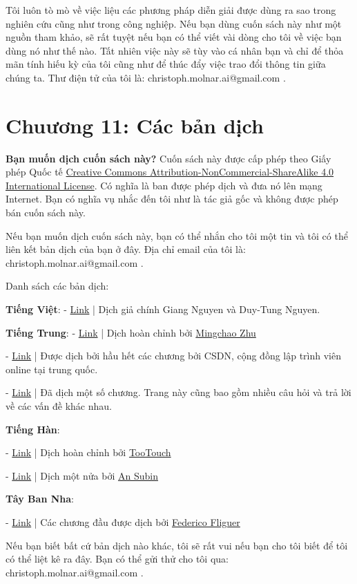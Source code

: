     
Tôi luôn tò mò về việc liệu các phương pháp diễn giải được dùng ra sao trong nghiên cứu cũng như trong công nghiệp. Nếu bạn dùng  cuốn sách này như một nguồn tham khảo, sẽ rất tuyệt nếu bạn có thể viết vài dòng cho tôi về việc bạn dùng nó như thế nào. Tất nhiên việc này sẽ tùy vào cá nhân bạn và chỉ để thỏa mãn tính hiếu kỳ của tôi cũng như để thúc đẩy việc trao đổi thông tin giữa chúng ta. Thư điện tử của tôi là: christoph.molnar.ai@gmail.com .

\chapter*{Chuương 11: Các bản dịch}

\textbf{Bạn muốn dịch cuốn sách này?}
 Cuốn sách này được cấp phép theo Giấy phép Quốc tế \href{http://creativecommons.org/licenses/by-nc-sa/4.0/}{Creative Commons Attribution-NonCommercial-ShareAlike 4.0 International License}. Có nghĩa là ban được phép dịch và đưa nó lên mạng Internet. Bạn có nghĩa vụ nhắc đến tôi như là tác giả gốc và không được phép bán cuốn sách này.

Nếu bạn muốn dịch cuốn sách này, bạn có thể nhắn cho tôi một tin và tôi có thể liên kết bản dịch của bạn ở đây. Địa chỉ email của tôi là: christoph.molnar.ai@gmail.com .

Danh sách các bản dịch:

\textbf{Tiếng Việt}:
- \href{https://github.com/giangnguyen2412/InterpretableMLBook-Vietnamese}{Link} | Dịch giả chính Giang Nguyen và Duy-Tung Nguyen.

\textbf{Tiếng Trung}:
- \href{https://github.com/MingchaoZhu/InterpretableMLBook}{Link}  | Dịch hoàn chỉnh bởi \href{https://github.com/MingchaoZhu}{Mingchao Zhu}

- \href{https://blog.csdn.net/wizardforcel/article/details/98992150}{Link} | Được dịch bởi hầu hết các chương bởi CSDN, cộng đồng lập trình viên online tại trung quốc.

- \href{https://zhuanlan.zhihu.com/p/63408696}{Link} | Đã dịch một số chương. Trang này cũng bao gồm nhiều câu hỏi và trả lời về các vấn đề khác nhau.

\textbf{Tiếng Hàn}:

- \href{https://tootouch.github.io/IML/taxonomy\_of\_interpretability\_methods/}{Link} | Dịch hoàn chỉnh bởi \href{https://tootouch.github.io/}{TooTouch}

- \href{https://subinium.github.io/IML/}{Link} | Dịch một nửa bởi \href{https://subinium.github.io/}{An Subin}

\textbf{Tây Ban Nha}:

- \href{https://fedefliguer.github.io/AAI/}{Link} | Các chương đầu được dịch bởi \href{https://fedefliguer.github.io/}{Federico Fliguer}

Nếu bạn biết bất cứ bản dịch nào khác, tôi sẽ rất vui nếu bạn cho tôi biết để tôi có thể liệt kê ra đây. Bạn có thể gửi thử cho tôi qua: christoph.molnar.ai@gmail.com .
